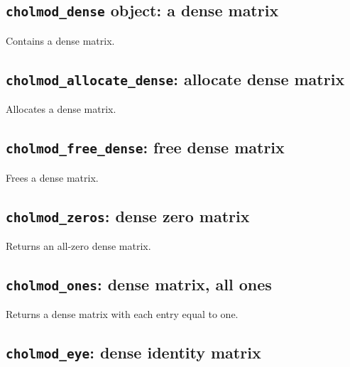 \documentclass[11pt]{article}
\begin{document}
\subsection{{\tt cholmod\_dense} object: a dense matrix}


Contains a dense matrix.

\subsection{{\tt cholmod\_allocate\_dense}: allocate dense matrix}


Allocates a dense matrix.

\subsection{{\tt cholmod\_free\_dense}: free dense matrix}


Frees a dense matrix.


\subsection{{\tt cholmod\_zeros}: dense zero matrix}


Returns an all-zero dense matrix.

\subsection{{\tt cholmod\_ones}: dense matrix, all ones}


Returns a dense matrix with each entry equal to one.

\subsection{{\tt cholmod\_eye}: dense identity matrix}
\end{document}
